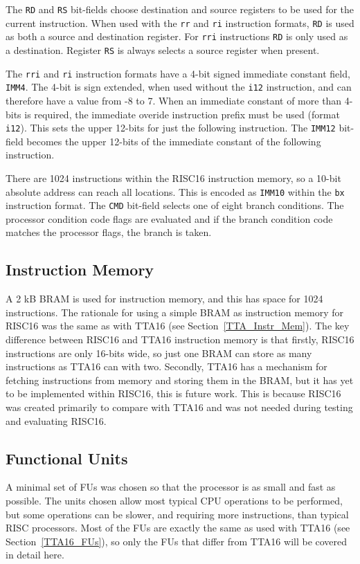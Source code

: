 The \texttt{RD} and \texttt{RS} bit-fields choose destination and source
registers to be used for the current instruction. When used with the \texttt{rr}
and \texttt{ri} instruction formats, \texttt{RD} is used as both a source and
destination register. For \texttt{rri} instructions \texttt{RD} is only used as a
destination. Register \texttt{RS} is always selects a source register when
present.

The \texttt{rri} and \texttt{ri} instruction formats have a 4-bit signed
immediate constant field, \texttt{IMM4}. The 4-bit is sign extended, when used
without the \texttt{i12} instruction, and can therefore have a value from -8 to
7. When an immediate constant of more than 4-bits is required, the immediate
overide instruction prefix must be used (format \texttt{i12}). This sets the
upper 12-bits for just the following instruction. The \texttt{IMM12} bit-field
becomes the upper 12-bits of the immediate constant of the following instruction.

There are 1024 instructions within the RISC16 instruction memory, so a 10-bit
absolute address can reach all locations. This is encoded as \texttt{IMM10}
within the \texttt{bx} instruction format. The \texttt{CMD} bit-field selects one
of eight branch conditions. The processor condition code flags are evaluated and
if the branch condition code matches the processor flags, the branch is taken.


\subsection{Instruction Memory}
A 2 kB BRAM is used for instruction memory, and this has space for 1024
instructions. The rationale for using a simple BRAM as instruction memory for
RISC16 was the same as with TTA16 (see Section~\ref{TTA_Instr_Mem}). The key
difference between RISC16 and TTA16 instruction memory is that firstly, RISC16
instructions are only 16-bits wide, so just one BRAM can store as many
instructions as TTA16 can with two. Secondly, TTA16 has a mechanism for fetching
instructions from memory and storing them in the BRAM, but it has yet to be
implemented within RISC16, this is future work. This is because RISC16 was
created primarily to compare with TTA16 and was not needed during testing and
evaluating RISC16.


\subsection{Functional Units}
A minimal set of FUs was chosen so that the processor is as small and fast as
possible. The units chosen allow most typical CPU operations to be performed, but
some operations can be slower, and requiring more instructions, than typical RISC
processors. Most of the FUs are exactly the same as used with TTA16 (see
Section~\ref{TTA16_FUs}), so only the FUs that differ from TTA16 will be covered
in detail here.

